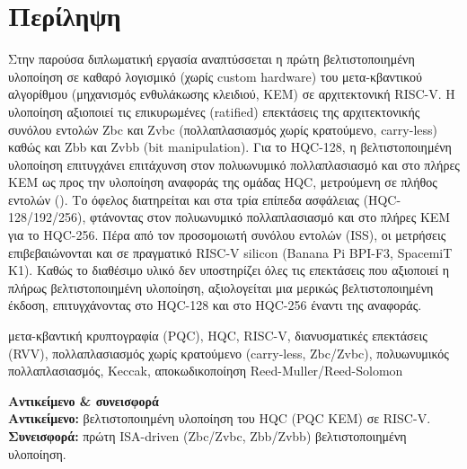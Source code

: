 \chapter*{Περίληψη}

Στην παρούσα διπλωματική εργασία αναπτύσσεται η πρώτη βελτιστοποιημένη 
υλοποίηση σε καθαρό λογισμικό (χωρίς custom hardware) του μετα-κβαντικού 
αλγορίθμου \HQC (μηχανισμός ενθυλάκωσης κλειδιού, KEM) σε αρχιτεκτονική RISC-V.
Η υλοποίηση αξιοποιεί τις επικυρωμένες (ratified) επεκτάσεις της 
αρχιτεκτονικής συνόλου εντολών Zbc και Zvbc (πολλαπλασιασμός χωρίς 
κρατούμενο, carry-less) καθώς και Zbb και Zvbb (bit manipulation). 
Για το HQC-128, η βελτιστοποιημένη υλοποίηση επιτυγχάνει επιτάχυνση 
 στον πολυωνυμικό πολλαπλασιασμό και  στο 
πλήρες KEM ως προς την υλοποίηση αναφοράς της ομάδας HQC, μετρούμενη 
σε πλήθος εντολών (\instret). Το όφελος διατηρείται και στα τρία επίπεδα 
ασφάλειας (HQC-128/192/256), φτάνοντας  στον πολυωνυμικό 
πολλαπλασιασμό και  στο πλήρες KEM για το HQC-256. 
Πέρα από τον προσομοιωτή συνόλου εντολών (ISS), οι μετρήσεις επιβεβαιώνονται
και σε πραγματικό RISC-V silicon (Banana Pi BPI-F3, SpacemiT K1). Καθώς το
διαθέσιμο υλικό δεν υποστηρίζει όλες τις επεκτάσεις που αξιοποιεί η πλήρως
βελτιστοποιημένη υλοποίηση, αξιολογείται μια μερικώς βελτιστοποιημένη έκδοση,
επιτυγχάνοντας  στο HQC-128 και  στο HQC-256 έναντι
της αναφοράς.

\begin{thesiskeywordsel}
  μετα-κβαντική κρυπτογραφία (PQC),\; HQC,\; RISC-V,\;
  διανυσματικές επεκτάσεις (RVV),\; πολλαπλασιασμός χωρίς κρατούμενο (carry-less, Zbc/Zvbc),\;
  πολυωνυμικός πολλαπλασιασμός,\; Keccak,\; αποκωδικοποίηση Reed-Muller/Reed-Solomon
\end{thesiskeywordsel}

\begin{thesisscope}
\textbf{Αντικείμενο \& συνεισφορά}\\[0.35em]
\textbf{Αντικείμενο:} βελτιστοποιημένη υλοποίηση του HQC (PQC KEM) σε RISC-V.\\
\textbf{Συνεισφορά:} πρώτη ISA-driven (Zbc/Zvbc, Zbb/Zvbb) βελτιστοποιημένη υλοποίηση.
\end{thesisscope}

\vspace{1em}
\thesismetaboxel
